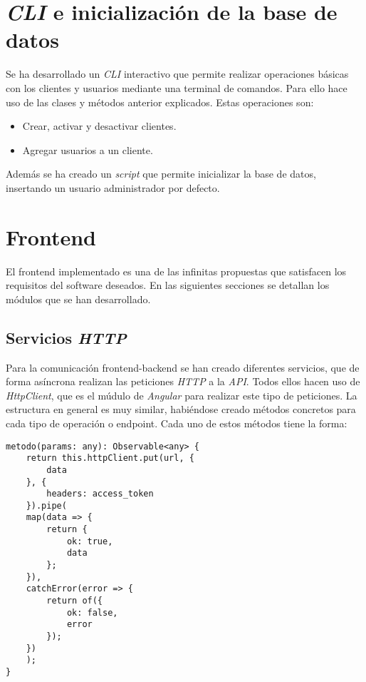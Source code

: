 \section{\textit{CLI} e inicialización de la base de datos}


Se ha desarrollado un \textit{CLI} interactivo que permite realizar operaciones básicas con los clientes y usuarios mediante una terminal de comandos. Para ello hace uso de las clases y métodos anterior explicados. Estas operaciones son:
\begin{itemize}
	\item Crear, activar y desactivar clientes.
	\item Agregar usuarios a un cliente.
\end{itemize}


Además se ha creado un \textit{script} que permite inicializar la base de datos, insertando un usuario administrador por defecto.





\section{Frontend}

El frontend implementado es una de las infinitas propuestas que satisfacen los requisitos del software deseados. En las siguientes secciones se detallan los módulos que se han desarrollado.



\subsection{Servicios \textit{HTTP}}


Para la comunicación frontend-backend se han creado diferentes servicios, que de forma asíncrona realizan las peticiones \textit{HTTP} a la \textit{API}. Todos ellos hacen uso de \textit{HttpClient}, que es el múdulo de \textit{Angular} para realizar este tipo de peticiones. La estructura en general es muy similar, habiéndose creado métodos concretos para cada tipo de operación o endpoint. Cada uno de estos métodos tiene la forma:

\begin{lstlisting}
metodo(params: any): Observable<any> {
	return this.httpClient.put(url, {
		data
	}, {
		headers: access_token
	}).pipe(
	map(data => {
		return {
			ok: true,
			data
		};
	}),
	catchError(error => {
		return of({
			ok: false,
			error
		});
	})
	);
}
\end{lstlisting}

